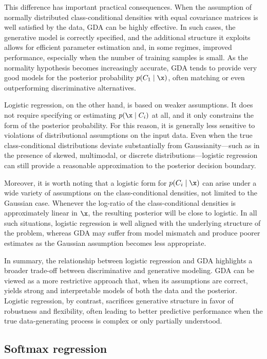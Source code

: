 This difference has important practical consequences. When the assumption of normally distributed class-conditional densities with equal covariance matrices is well satisfied by the data, GDA can be highly effective. In such cases, the generative model is correctly specified, and the additional structure it exploits allows for efficient parameter estimation and, in some regimes, improved performance, especially when the number of training samples is small. As the normality hypothesis becomes increasingly accurate, GDA tends to provide very good models for the posterior probability $ p(C_1 \mid \x) $, often matching or even outperforming discriminative alternatives.

Logistic regression, on the other hand, is based on weaker assumptions. It does not require specifying or estimating $ p(\x \mid C_i) $ at all, and it only constrains the form of the posterior probability. For this reason, it is generally less sensitive to violations of distributional assumptions on the input data. Even when the true class-conditional distributions deviate substantially from Gaussianity—such as in the presence of skewed, multimodal, or discrete distributions—logistic regression can still provide a reasonable approximation to the posterior decision boundary.

Moreover, it is worth noting that a logistic form for $ p(C_i \mid \x) $ can arise under a wide variety of assumptions on the class-conditional densities, not limited to the Gaussian case. Whenever the log-ratio of the class-conditional densities is approximately linear in $ \x $, the resulting posterior will be close to logistic. In all such situations, logistic regression is well aligned with the underlying structure of the problem, whereas GDA may suffer from model mismatch and produce poorer estimates as the Gaussian assumption becomes less appropriate.

In summary, the relationship between logistic regression and GDA highlights a broader trade-off between discriminative and generative modeling. GDA can be viewed as a more restrictive approach that, when its assumptions are correct, yields strong and interpretable models of both the data and the posterior. Logistic regression, by contrast, sacrifices generative structure in favor of robustness and flexibility, often leading to better predictive performance when the true data-generating process is complex or only partially understood.

\subsection*{Softmax regression}


